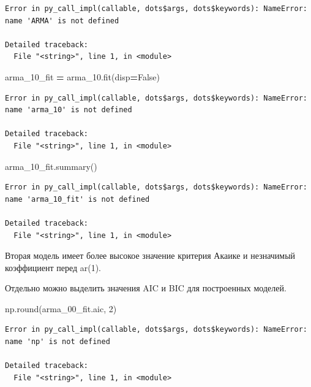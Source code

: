 \documentclass[]{book}
\newenvironment{Shaded}{\begin{snugshade}}{\end{snugshade}}
\newcommand{\BuiltInTok}[1]{#1}
\newcommand{\DecValTok}[1]{\textcolor[rgb]{0.00,0.00,0.81}{#1}}
\newcommand{\NormalTok}[1]{#1}
\newcommand{\OperatorTok}[1]{\textcolor[rgb]{0.81,0.36,0.00}{\textbf{#1}}}
\newcommand{\VariableTok}[1]{\textcolor[rgb]{0.00,0.00,0.00}{#1}}
\begin{document}
\begin{verbatim}
Error in py_call_impl(callable, dots$args, dots$keywords): NameError: name 'ARMA' is not defined

Detailed traceback: 
  File "<string>", line 1, in <module>
\end{verbatim}

\begin{Shaded}
\begin{Highlighting}[]
\NormalTok{arma_10_fit }\OperatorTok{=}\NormalTok{ arma_10.fit(disp}\OperatorTok{=}\VariableTok{False}\NormalTok{)}
\end{Highlighting}
\end{Shaded}

\begin{verbatim}
Error in py_call_impl(callable, dots$args, dots$keywords): NameError: name 'arma_10' is not defined

Detailed traceback: 
  File "<string>", line 1, in <module>
\end{verbatim}

\begin{Shaded}
\begin{Highlighting}[]
\NormalTok{arma_10_fit.summary()}
\end{Highlighting}
\end{Shaded}

\begin{verbatim}
Error in py_call_impl(callable, dots$args, dots$keywords): NameError: name 'arma_10_fit' is not defined

Detailed traceback: 
  File "<string>", line 1, in <module>
\end{verbatim}

Вторая модель имеет более высокое значение критерия Акаике и незначимый коэффициент перед ar(1).

Отдельно можно выделить значения AIC и BIC для построенных моделей.

\begin{Shaded}
\begin{Highlighting}[]
\NormalTok{np.}\BuiltInTok{round}\NormalTok{(arma_00_fit.aic, }\DecValTok{2}\NormalTok{)}
\end{Highlighting}
\end{Shaded}

\begin{verbatim}
Error in py_call_impl(callable, dots$args, dots$keywords): NameError: name 'np' is not defined

Detailed traceback: 
  File "<string>", line 1, in <module>
\end{verbatim}
\end{document}
